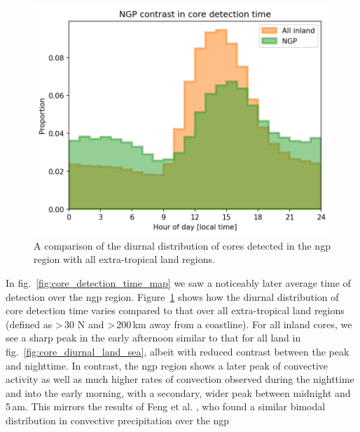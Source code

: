 \begin{figure}[tp]
    \centering
    \includegraphics[width=\textwidth]{figures/ch2_NGP_diurnal.png}
    \caption[
    A comparison of the diurnal distribution of cores detected in the \acrshort{ngp} region with all extra-tropical land regions
    ]{
    A comparison of the diurnal distribution of cores detected in the \acrshort{ngp} region with all extra-tropical land regions.
    }
    \label{fig:core_ngp_contrast}
\end{figure}

In fig.~\ref{fig:core_detection_time_map} we saw a noticeably later average time of detection over the \acrshort{ngp} region.
Figure~\ref{fig:core_ngp_contrast} shows how the diurnal distribution of core detection time varies compared to that over all extra-tropical land regions (defined as \textgreater\,30\,\textdegree\,N and \textgreater\,200\,\unit{km} away from a coastline).
For all inland cores, we see a sharp peak in the early afternoon similar to that for all land in fig.~\ref{fig:core_diurnal_land_sea}, albeit with reduced contrast between the peak and nighttime.
In contrast, the \acrshort{ngp} region shows a later peak of convective activity as well as much higher rates of convection observed during the nighttime and into the early morning, with a secondary, wider peak between midnight and 5\,am.
This mirrors the results of Feng et al. \cite{missing_feng_ngp}, who found a similar bimodal distribution in convective precipitation over the \acrshort{ngp}



